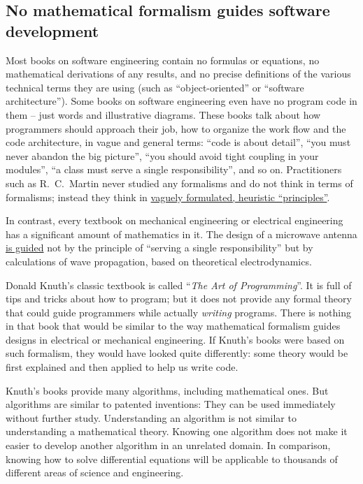 \subsection{No mathematical formalism guides software development}

Most books on software engineering contain no formulas or equations,
no mathematical derivations of any results, and no precise definitions
of the various technical terms they are using (such as ``object-oriented''
or ``software architecture''). Some books on software engineering
even have no program code in them – just words and illustrative diagrams.
These books talk about how programmers should approach their job,
how to organize the work flow and the code architecture, in vague
and general terms: ``code is about detail'', ``you must never abandon
the big picture'', ``you should avoid tight coupling in your modules'',
``a class must serve a single responsibility'', and so on. Practitioners
such as R.\ C.\ Martin never studied any formalisms and do not think
in terms of formalisms; instead they think in \href{https://blog.cleancoder.com/uncle-bob/2016/03/19/GivingUpOnTDD.html}{vaguely formulated, heuristic “principles”}.

In contrast, every textbook on mechanical engineering or electrical
engineering has a significant amount of mathematics in it. The design
of a microwave antenna \href{https://www.youtube.com/watch?v=46SbGxS73dY}{is guided}
not by the principle of ``serving a single responsibility'' but
by calculations of wave propagation, based on theoretical electrodynamics.

Donald Knuth's classic textbook is called ``\emph{The Art of Programming}''.
It is full of tips and tricks about how to program; but it does not
provide any formal theory that could guide programmers while actually
\emph{writing} programs. There is nothing in that book that would
be similar to the way mathematical formalism guides designs in electrical
or mechanical engineering. If Knuth's books were based on such formalism,
they would have looked quite differently: some theory would be first
explained and then applied to help us write code.

Knuth's books provide many algorithms, including mathematical ones.
But algorithms are similar to patented inventions: They can be used
immediately without further study. Understanding an algorithm is not
similar to understanding a mathematical theory. Knowing one algorithm
does not make it easier to develop another algorithm in an unrelated
domain. In comparison, knowing how to solve differential equations
will be applicable to thousands of different areas of science and
engineering.

